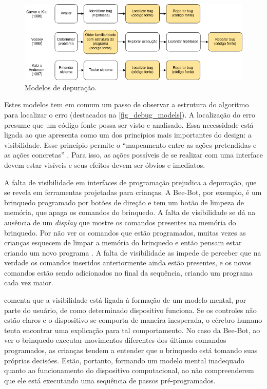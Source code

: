\begin{figure}[!htpb]
  \centering
  \includegraphics[width=.9\linewidth,fbox]{figs/debug_models.png}
  \caption{Modelos de depuração.}
  \sourceauthor
  \label{fig_debug_models}
\end{figure}

Estes modelos tem em comum um passo de observar a estrutura do algoritmo para localizar o erro (destacados na \autoref{fig_debug_models}). A localização do erro presume que um código fonte possa ser visto e analisado. Essa necessidade está ligada ao que  apresenta como um dos princípios mais importantes do design: a visibilidade. Esse princípio permite o “mapeamento entre as ações pretendidas e as ações concretas” \cite{norman_design_1988}. Para isso, as ações possíveis de se realizar com uma interface devem estar visíveis e seus efeitos devem ser óbvios e imediatos.

A falta de visibilidade em interfaces de programação prejudica a depuração, que se revela em ferramentas projetadas para crianças. A Bee-Bot, por exemplo, é um brinquedo programado por botões de direção e tem um botão de limpeza de memória, que apaga os comandos do brinquedo. A falta de visibilidade se dá na ausência de um \textit{display} que mostre os comandos presentes na memória do brinquedo. Por não ver os comandos que estão programados, muitas vezes as crianças esquecem de limpar a memória do brinquedo e então pensam estar criando um novo programa \cite{raabe_brinquedos_2015}. A falta de visibilidade as impede de perceber que na verdade os comandos inseridos anteriormente ainda estão presentes, e os novos comandos estão sendo adicionados no final da sequência, criando um programa cada vez maior.

 comenta que a visibilidade está ligada à formação de um modelo mental, por parte do usuário, de como determinado dispositivo funciona. Se os controles não estão claros e o dispositivo se comporta de maneira inesperada, o cérebro humano tenta encontrar uma explicação para tal comportamento. No caso da Bee-Bot, ao ver o brinquedo executar movimentos diferentes dos últimos comandos programados, as crianças tendem a entender que o brinquedo está tomando suas próprias decisões. Estão, portanto, formando um modelo mental inadequado quanto ao funcionamento do dispositivo computacional, ao não compreenderem que ele está executando uma sequência de passos pré-programados. 

